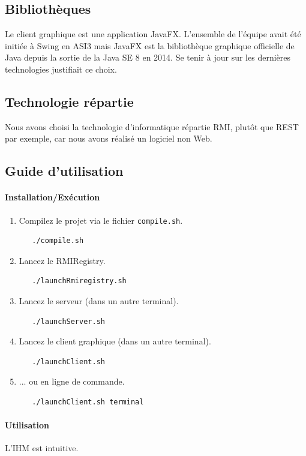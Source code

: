 \documentclass[11pt,dvipsnames,svgnames]{report}
\begin{document}
\subsection{Bibliothèques}
Le client graphique est une application JavaFX. L'ensemble de l'équipe avait été initiée à Swing en ASI3 mais JavaFX est la bibliothèque graphique officielle de Java depuis la sortie de la Java SE 8 en 2014. Se tenir à jour sur les dernières technologies justifiait ce choix.
\subsection{Technologie répartie}
Nous avons choisi la technologie d'informatique répartie RMI, plutôt que REST par exemple, car nous avons réalisé un logiciel non Web.
\subsection{Guide d'utilisation}
\paragraph*{Installation/Exécution}
\begin{enumerate}
\item Compilez le projet via le fichier \texttt{compile.sh}.
\begin{lstlisting}
   ./compile.sh
\end{lstlisting}
\item Lancez le RMIRegistry.
\begin{lstlisting}
   ./launchRmiregistry.sh
\end{lstlisting}
\item Lancez le serveur (dans un autre terminal).
\begin{lstlisting}
   ./launchServer.sh
\end{lstlisting}
\item Lancez le client graphique (dans un autre terminal).
\begin{lstlisting}
   ./launchClient.sh 
\end{lstlisting}
\item ... ou en ligne de commande.
\begin{lstlisting}
   ./launchClient.sh terminal
\end{lstlisting}
\end{enumerate}

\paragraph*{Utilisation}
L'IHM est intuitive.
\end{document}
